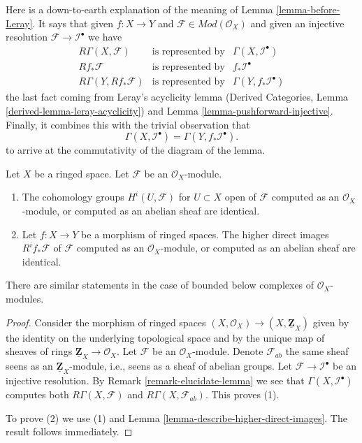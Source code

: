 \begin{remark}
\label{remark-elucidate-lemma}
Here is a down-to-earth explanation of the meaning of
Lemma \ref{lemma-before-Leray}. It says that given
$f : X \to Y$ and $\mathcal{F} \in \textit{Mod}(\mathcal{O}_X)$
and given an injective resolution $\mathcal{F} \to \mathcal{I}^\bullet$
we have
$$
\begin{matrix}
R\Gamma(X, \mathcal{F}) & \text{is represented by} &
\Gamma(X, \mathcal{I}^\bullet) \\
Rf_*\mathcal{F} & \text{is represented by} & f_*\mathcal{I}^\bullet \\
R\Gamma(Y, Rf_*\mathcal{F}) & \text{is represented by} &
\Gamma(Y, f_*\mathcal{I}^\bullet)
\end{matrix}
$$
the last fact coming from Leray's acyclicity lemma
(Derived Categories, Lemma \ref{derived-lemma-leray-acyclicity})
and Lemma \ref{lemma-pushforward-injective}.
Finally, it combines this with the trivial observation that
$$
\Gamma(X, \mathcal{I}^\bullet)
=
\Gamma(Y, f_*\mathcal{I}^\bullet).
$$
to arrive at the commutativity of the diagram of the lemma.
\end{remark}

\begin{lemma}
\label{lemma-modules-abelian}
Let $X$ be a ringed space.
Let $\mathcal{F}$ be an $\mathcal{O}_X$-module.
\begin{enumerate}
\item The cohomology groups $H^i(U, \mathcal{F})$ for $U \subset X$ open
of $\mathcal{F}$ computed as an $\mathcal{O}_X$-module, or computed as an
abelian sheaf are identical.
\item Let $f : X \to Y$ be a morphism of ringed spaces.
The higher direct images $R^if_*\mathcal{F}$ of $\mathcal{F}$
computed as an $\mathcal{O}_X$-module, or computed as an abelian sheaf
are identical.
\end{enumerate}
There are similar statements in the case of bounded below
complexes of $\mathcal{O}_X$-modules.
\end{lemma}

\begin{proof}
Consider the morphism of ringed spaces
$(X, \mathcal{O}_X) \to (X, \underline{\mathbf{Z}}_X)$ given
by the identity on the underlying topological space and by
the unique map of sheaves of rings
$\underline{\mathbf{Z}}_X \to \mathcal{O}_X$.
Let $\mathcal{F}$ be an $\mathcal{O}_X$-module.
Denote $\mathcal{F}_{ab}$ the same sheaf seens as an
$\underline{\mathbf{Z}}_X$-module, i.e., seens as a sheaf of
abelian groups. Let
$\mathcal{F} \to \mathcal{I}^\bullet$ be an injective resolution.
By Remark \ref{remark-elucidate-lemma} we see that
$\Gamma(X, \mathcal{I}^\bullet)$ computes both
$R\Gamma(X, \mathcal{F})$ and $R\Gamma(X, \mathcal{F}_{ab})$.
This proves (1).

\medskip\noindent
To prove (2) we use (1) and Lemma \ref{lemma-describe-higher-direct-images}.
The result follows immediately.
\end{proof}

